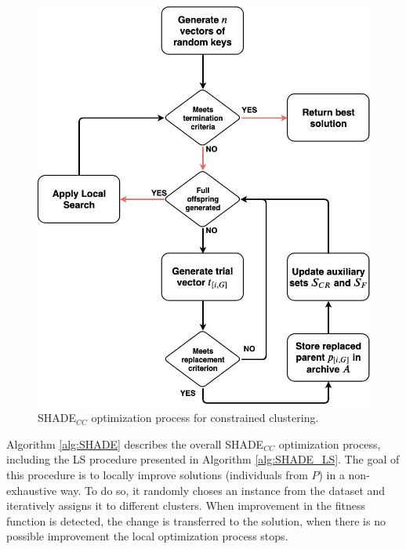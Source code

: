\begin{figure}[!h]
	\centering
	\includegraphics[scale=0.3]{gfx/NewProp/SHADE/SHADE_Diagram.jpg} 
	\caption{\acs{SHADE}$_{CC}$ optimization process for constrained clustering.}\label{fig:SHADE_CC}
\end{figure}

Algorithm \ref{alg:SHADE} describes the overall \acs{SHADE}$_{CC}$ optimization process, including the \acs{LS} procedure presented in Algorithm \ref{alg:SHADE_LS}. The goal of this procedure is to locally improve solutions (individuals from $P$) in a non-exhaustive way. To do so, it randomly choses an instance from the dataset and iteratively assigns it to different clusters. When improvement in the fitness function is detected, the change is transferred to the solution, when there is no possible improvement the local optimization process stops.

